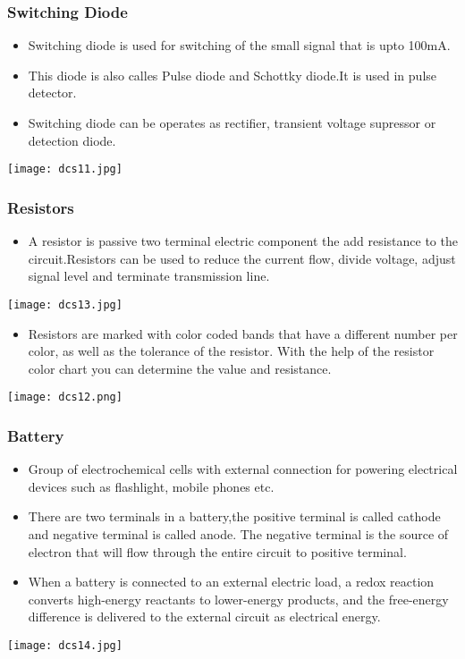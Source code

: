 \documentclass{article}
\begin{document}
\subsubsection{Switching Diode}
\begin{itemize}
\item Switching diode is used for switching of the small signal that is upto 100mA.
\item This diode is also calles Pulse diode and Schottky diode.It is used in pulse detector.
\item Switching diode can be operates as rectifier, transient voltage supressor or detection diode.
\end{itemize}
\center
\texttt{[image: dcs11.jpg]}

\subsubsection{Resistors}
\begin{itemize}
\item A resistor is passive two terminal electric component the add resistance to the circuit.Resistors can be used to reduce the current flow, divide voltage, adjust signal level and terminate transmission line.
\end{itemize}
\center
\texttt{[image: dcs13.jpg]}
\begin{itemize}
\item Resistors are marked with color coded bands that have a different number per color, as well as the tolerance of the resistor. With the help of the resistor color chart you can determine the value and resistance.
\end{itemize}
\center
\texttt{[image: dcs12.png]}

\subsubsection{Battery}
\begin{itemize}
\item Group of electrochemical cells with external connection for powering electrical devices such as flashlight, mobile phones etc.
\item There are two terminals in a battery,the positive terminal is called cathode and negative terminal is called anode. The negative terminal is the source of electron that will flow through the entire circuit to positive terminal. 
\item When a battery is connected to an external electric load, a redox reaction converts high-energy reactants to lower-energy products, and the free-energy difference is delivered to the external circuit as electrical energy.
\end{itemize}
\texttt{[image: dcs14.jpg]}
\end{document}
